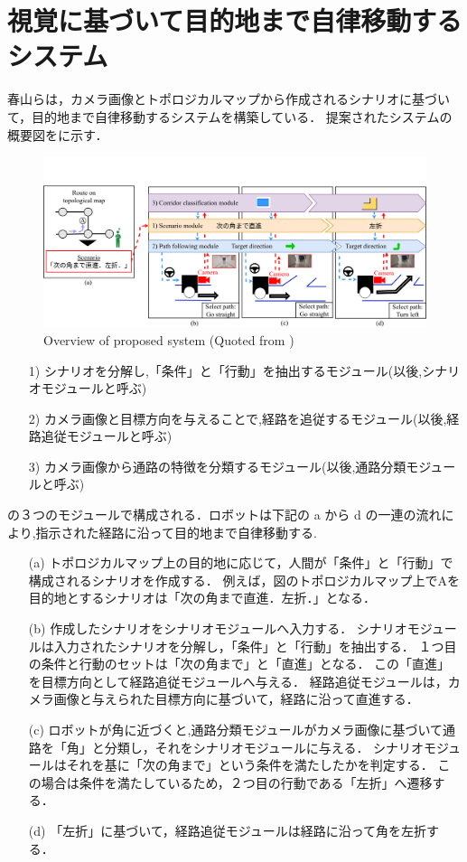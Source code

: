 \section{視覚に基づいて目的地まで自律移動するシステム}
春山らは，カメラ画像とトポロジカルマップから作成されるシナリオに基づいて，目的地まで自律移動するシステムを構築している．
提案されたシステムの概要図をに示す．

\begin{figure}[htbp]
  \centering
   \includegraphics[width=130mm]{images/pdf/haruyama/system.pdf}
   \caption{Overview of proposed system (Quoted from \cite{haruyama2023})}
   \label{fig:sys}
\end{figure}

\begin{enumerate}
  \item [1)]シナリオを分解し,「条件」と「行動」を抽出するモジュール(以後,シナリオモジュールと呼ぶ)
  \item [2)]カメラ画像と目標方向を与えることで,経路を追従するモジュール(以後,経路追従モジュールと呼ぶ)
  \item [3)]カメラ画像から通路の特徴を分類するモジュール(以後,通路分類モジュールと呼ぶ)
\end{enumerate}

の３つのモジュールで構成される．ロボットは下記の a から d の一連の流れにより,指示された経路に沿って目的地まで自律移動する.
\begin{enumerate}
  \item [(a)] 
  トポロジカルマップ上の目的地に応じて，人間が「条件」と「行動」で構成されるシナリオを作成する．
  例えば，図のトポロジカルマップ上でAを目的地とするシナリオは「次の角まで直進．左折．」となる．
  \item [(b)] 
  作成したシナリオをシナリオモジュールへ入力する．
  シナリオモジュールは入力されたシナリオを分解し，「条件」と「行動」を抽出する．
  １つ目の条件と行動のセットは「次の角まで」と「直進」となる．
  この「直進」を目標方向として経路追従モジュールへ与える．
  経路追従モジュールは，カメラ画像と与えられた目標方向に基づいて，経路に沿って直進する．
  \item [(c)] 
  ロボットが角に近づくと,通路分類モジュールがカメラ画像に基づいて通路を「角」と分類し，それをシナリオモジュールに与える．
  シナリオモジュールはそれを基に「次の角まで」という条件を満たしたかを判定する．
  この場合は条件を満たしているため，２つ目の行動である「左折」へ遷移する．
  \item [(d)]「左折」に基づいて，経路追従モジュールは経路に沿って角を左折する．
\end{enumerate}


